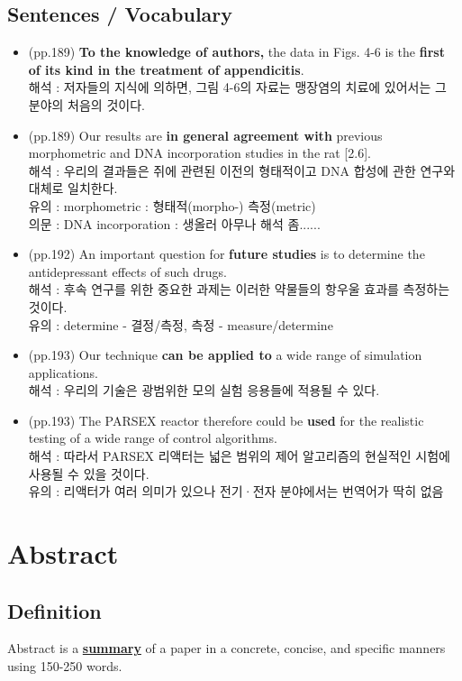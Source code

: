 \documentclass[10pt]{report}
\begin{document}
	\section{Sentences / Vocabulary}
	\begin{itemize}
		\item (pp.189) {\bf To the knowledge of authors,} the data in Figs. 4-6 is the {\bf first of its kind in the treatment of appendicitis}. \\
		해석 : 저자들의 지식에 의하면, 그림 4-6의 자료는 맹장염의 치료에 있어서는 그 분야의 처음의 것이다. 
		\item (pp.189) Our results are {\bf in general agreement with} previous morphometric and DNA incorporation studies in the rat [2.6]. \\
		해석 : 우리의 결과들은 쥐에 관련된 이전의 형태적이고 DNA 합성에 관한 연구와 대체로 일치한다. \\
		유의 : morphometric : 형태적(morpho-) 측정(metric) \\
		의문 : DNA incorporation : 생올러 아무나 해석 좀......
		\item (pp.192) An important question for {\bf future studies} is to determine the antidepressant effects of such drugs. \\
		해석 : 후속 연구를 위한 중요한 과제는 이러한 약물들의 항우울 효과를 측정하는 것이다. \\
		유의 : determine - 결정/측정, 측정 - measure/determine
		\item (pp.193) Our technique {\bf can be applied to} a wide range of simulation applications. \\
		해석 : 우리의 기술은 광범위한 모의 실험 응용들에 적용될 수 있다.
		\item (pp.193) The PARSEX reactor therefore could be {\bf used} for the realistic testing of a wide range of control algorithms. \\
		해석 : 따라서 PARSEX 리액터는 넓은 범위의 제어 알고리즘의 현실적인 시험에 사용될 수 있을 것이다. \\
		유의 : 리액터가 여러 의미가 있으나 전기·전자 분야에서는 번역어가 딱히 없음
	\end{itemize}
	\chapter{Abstract}
	
	\section{Definition}
	\Large Abstract is a \underline{\textbf{summary}} of a paper in a concrete, concise, and specific manners using 150-250 words.
	\normalsize
	
\end{document}
